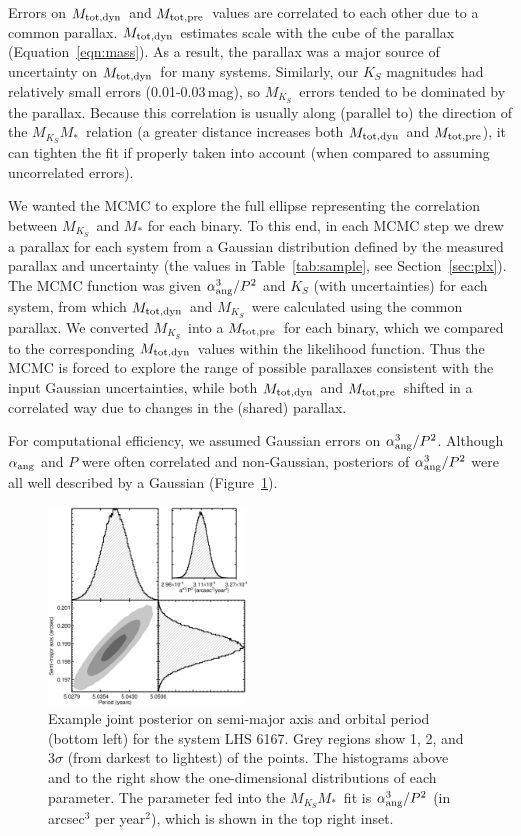 \documentclass[twocolumn]{aastex62}
\newcommand{\mks}{$M_{K_S}$}
\newcommand{\mmk}{$M_{K_S}$\textendash$M_*$}
\newcommand{\mpred}{$M_{\rm{tot,pre}}$}
\newcommand{\mdyn}{$M_{\rm{tot,dyn}}$}
\begin{document}
Errors on \mdyn\ and \mpred\ values are correlated to each other due to a common parallax. \mdyn\ estimates scale with the cube of the parallax (Equation~\ref{eqn:mass}). As a result, the parallax was a major source of uncertainty on \mdyn\ for many systems. Similarly, our $K_S$ magnitudes had relatively small errors (0.01-0.03\,mag), so \mks\ errors tended to be dominated by the parallax. Because this correlation is usually along (parallel to) the direction of the \mmk\ relation (a greater distance increases both \mdyn\ and \mpred), it can tighten the fit if properly taken into account (when compared to assuming uncorrelated errors). 

We wanted the MCMC to explore the full ellipse representing the correlation between \mks\ and $M_*$ for each binary. To this end, in each MCMC step we drew a parallax for each system from a Gaussian distribution defined by the measured parallax and uncertainty (the values in Table~\ref{tab:sample}, see Section~\ref{sec:plx}). The MCMC function was given $\alpha_{\rm{ang}}^3/P^2$ and $K_S$ (with uncertainties) for each system, from which \mdyn\ and \mks\ were calculated using the common parallax. We converted \mks\ into a \mpred\ for each binary, which we compared to the corresponding \mdyn\ values within the likelihood function. Thus the MCMC is forced to explore the range of possible parallaxes consistent with the input Gaussian uncertainties, while both \mdyn\ and \mpred\ shifted in a correlated way due to changes in the (shared) parallax. 

For computational efficiency, we assumed Gaussian errors on $\alpha_{\rm{ang}}^3/P^2$. Although $\alpha_{\rm{ang}}$ and $P$ were often correlated and non-Gaussian, posteriors of $\alpha_{\rm{ang}}^3/P^2$ were all well described by a Gaussian (Figure~\ref{fig:correlated}). 

\begin{figure}[htb]
\begin{center}
\includegraphics[width=0.47\textwidth]{LHS6167_corner.eps}
\caption{Example joint posterior on semi-major axis and orbital period (bottom left) for the system LHS 6167. Grey regions show 1, 2, and 3$\sigma$ (from darkest to lightest) of the points. The histograms above and to the right show the one-dimensional distributions of each parameter. The parameter fed into the \mmk\ fit is $\alpha_{\rm{ang}}^3/P^2$ (in arcsec$^3$ per year$^2$), which is shown in the top right inset. }
\label{fig:correlated}
\end{center}
\end{figure}
\end{document}
